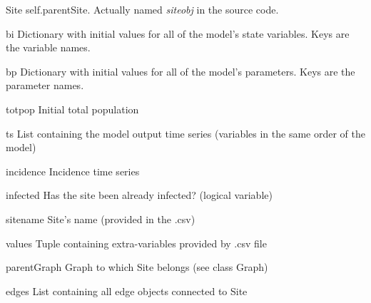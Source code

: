 \documentclass[a4paper,10pt]{manual}
\begin{document}
\hypertarget{Site}{}\begin{classdesc}{Site}{}
self.parentSite. Actually named \emph{siteobj} in the source code.


\hypertarget{Site.bi}{}\begin{memberdesc}{bi}
Dictionary with initial values for all of the model's state variables. Keys are the variable names.
\end{memberdesc}


\hypertarget{Site.bp}{}\begin{memberdesc}{bp}
Dictionary with initial values for all of the model's parameters. Keys are the parameter names.
\end{memberdesc}


\hypertarget{Site.totpop}{}\begin{memberdesc}{totpop}
Initial total population
\end{memberdesc}


\hypertarget{Site.ts}{}\begin{memberdesc}{ts}
List containing the model output time series (variables in the same order of the model)
\end{memberdesc}


\hypertarget{Site.incidence}{}\begin{memberdesc}{incidence}
Incidence time series
\end{memberdesc}


\hypertarget{Site.infected}{}\begin{memberdesc}{infected}
Has the site been already infected? (logical variable)
\end{memberdesc}


\hypertarget{Site.sitename}{}\begin{memberdesc}{sitename}
Site's name (provided in the .csv)
\end{memberdesc}


\hypertarget{Site.values}{}\begin{memberdesc}{values}
Tuple containing extra-variables provided by .csv file
\end{memberdesc}


\hypertarget{Site.parentGraph}{}\begin{memberdesc}{parentGraph}
Graph to which Site belongs (see class Graph)
\end{memberdesc}


\hypertarget{Site.edges}{}\begin{memberdesc}{edges}
List containing all edge objects connected to Site
\end{memberdesc}



\end{classdesc}
\end{document}
